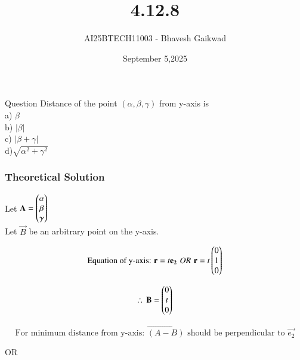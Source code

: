 \documentclass{beamer}
\title
{4.12.8}
\date{September 5,2025}
\author 
{AI25BTECH11003 - Bhavesh Gaikwad}
\begin{document}
\frame{\titlepage}
\begin{frame}{Question}
Distance of the point $(\alpha, \beta, \gamma)$ from y-axis is\\
a) $\beta$\\
b) $|\beta|$\\
c) $|\beta + \gamma|$\\
d)$\sqrt{\alpha^2 + \gamma^2}$ \\
\end{frame}


\begin{frame}[fragile]
    \frametitle{Theoretical Solution}
Let $\mathbf{A} = \begin{pmatrix}\alpha \\ \beta \\ \gamma\end{pmatrix}$\\ 
Let $\vec{B}$ be an arbitrary point on the y-axis.

\begin{equation}
    \text{Equation of y-axis: } \mathbf{r} = t\mathbf{e_2} \, \,
    OR \, \, \mathbf{r}=t\begin{pmatrix}0 \\ 1 \\ 0\end{pmatrix}
\end{equation}

\begin{equation}
\therefore \, \mathbf{B}=\begin{pmatrix}0 \\ t \\0\end{pmatrix}
\end{equation}

\begin{equation}
\text{For minimum distance from y-axis: } \vec{(A-B)} \text{ should be perpendicular to } \vec{e_2}
\end{equation}

\begin{center}
    OR
\end{center}

\end{frame}
\end{document}
